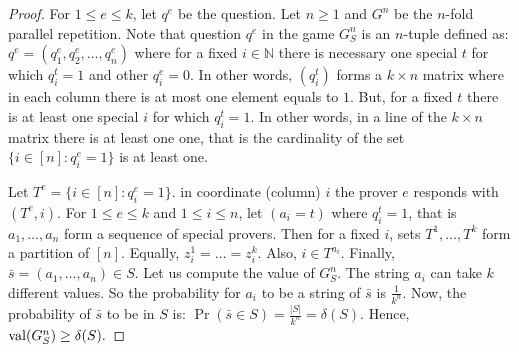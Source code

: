 \begin{proof}
  For $1\leq e \leq k$, let $q^e$ be the question. Let $n \geq 1$ and $G^n$ be the $n$-fold parallel repetition. Note that question $q^e$ in the game $G^n_S$ is an $n$-tuple defined as: $q^e=(q_1^e, q_2^e, \ldots, q_n^e)$ where for a fixed $i \in \mathbb{N}$ there is necessary  one special $t$ for which $q_i^t=1$ and other $q_i^e=0$.  In other words, $(q_i^t)$  forms a  $k \times n$ matrix where in each column there is at most
  one element equals to $1.$ But, for a fixed $t$ there is at least one special $i$ for which $q_i^t=1$. In other words, in a line of the $k \times n$ matrix there is at least one one, that is the cardinality of the set $\{i \in [n]: q_i^e=1\}$ is at least one.

  Let  $T^e=\{i \in [n]: q_i^e=1\}$. in coordinate (column) $i$ the prover $e$ responds with $(T^e,i).$ For $1\leq e \leq k$ and $1\leq i  \leq n$, let  $(a_i=t)$ where $q_i^t=1$, that is $a_1, \ldots, a_n$ form a sequence of special provers.  Then for a fixed $i$, sets $T^1, \ldots, T^k$ form a partition of $[n].$ Equally, $z_i^1=\ldots=z_i^k.$
  Also, $i \in T^{a_i}$.
  Finally, $\bar{s}=(a_1, \ldots, a_n) \in S.$
  Let us compute the value of $G_S^n$. The string
  $a_i$ can take $k$ different values. So the probability for $a_i$ to be a string of
  $\bar{s}$ is $\frac{1}{k^n}$. Now, the probability of $\bar{s}$ to be in $S$ is:  $\Pr (\bar{s} \in S)=  \frac{|S|}{k^n}=\delta(S).$ Hence, $\mathrm{val} (G_S^n) \geq \delta (S).$

\end{proof}




